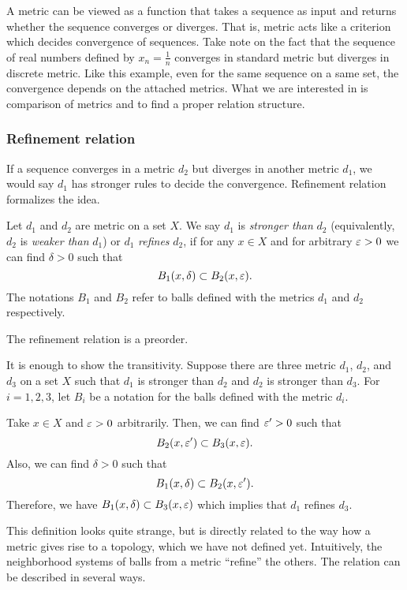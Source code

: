 A metric can be viewed as a function that takes a sequence as input and returns whether the sequence converges or diverges.
That is, metric acts like a criterion which decides convergence of sequences.
Take note on the fact that the sequence of real numbers defined by $x_n=\frac1n$ converges in standard metric but diverges in discrete metric.
Like this example, even for the same sequence on a same set, the convergence depends on the attached metrics.
What we are interested in is comparison of metrics and to find a proper relation structure.

\subsubsection{Refinement relation}

If a sequence converges in a metric $d_2$ but diverges in another metric $d_1$, we would say $d_1$ has stronger rules to decide the convergence.
Refinement relation formalizes the idea.

\begin{defn}
Let $d_1$ and $d_2$ are metric on a set $X$.
We say $d_1$ is \emph{stronger than} $d_2$ (equivalently, $d_2$ is \emph{weaker than} $d_1$) or $d_1$ \emph{refines} $d_2$, if for any $x\in X$ and for arbitrary $\varepsilon>0$ we can find $\delta>0$ such that
\[B_1(x,\delta)\subset B_2(x,\varepsilon).\]
The notations $B_1$ and $B_2$ refer to balls defined with the metrics $d_1$ and $d_2$ respectively.
\end{defn}

\begin{prop}
The refinement relation is a preorder.
\end{prop}
\begin{pf}
It is enough to show the transitivity.
Suppose there are three metric $d_1$, $d_2$, and $d_3$ on a set $X$ such that $d_1$ is stronger than $d_2$ and $d_2$ is stronger than $d_3$.
For $i=1,2,3$, let $B_i$ be a notation for the balls defined with the metric $d_i$.

Take $x\in X$ and $\varepsilon>0$ arbitrarily.
Then, we can find $\varepsilon'>0$ such that
\[B_2(x,\varepsilon')\subset B_3(x,\varepsilon).\]
Also, we can find $\delta>0$ such that
\[B_1(x,\delta)\subset B_2(x,\varepsilon').\]
Therefore, we have $B_1(x,\delta)\subset B_3(x,\varepsilon)$ which implies that $d_1$ refines $d_3$.
\end{pf}

This definition looks quite strange, but is directly related to the way how a metric gives rise to a topology, which we have not defined yet.
Intuitively, the neighborhood systems of balls from a metric ``refine'' the others.
The relation can be described in several ways.

